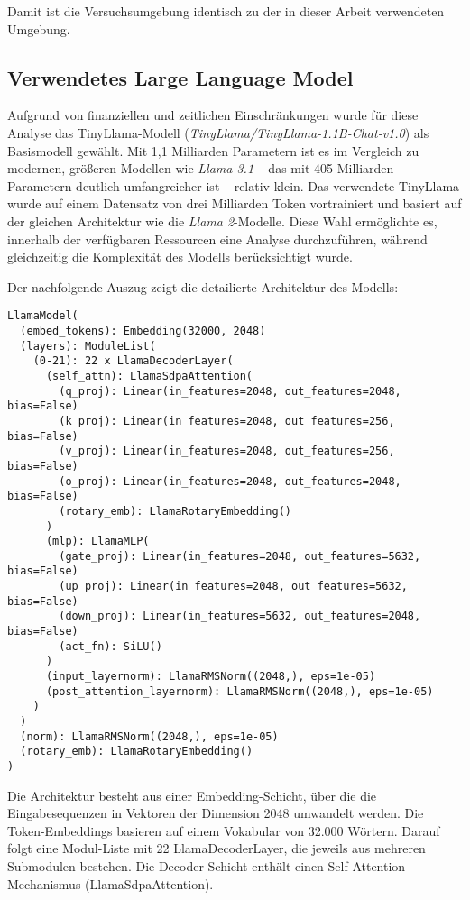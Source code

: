 Damit ist die Versuchsumgebung identisch zu der in dieser Arbeit verwendeten
Umgebung.

\subsection{Verwendetes Large Language Model}

Aufgrund von finanziellen und zeitlichen Einschränkungen wurde für diese Analyse
das TinyLlama-Modell (\emph{TinyLlama/TinyLlama-1.1B-Chat-v1.0}) als Basismodell
gewählt. Mit 1,1 Milliarden Parametern ist es im Vergleich zu modernen, größeren
Modellen wie \emph{Llama 3.1} – das mit 405 Milliarden Parametern deutlich
umfangreicher ist – relativ klein. Das verwendete TinyLlama wurde auf einem
Datensatz von drei Milliarden Token vortrainiert und basiert auf der gleichen
Architektur wie die \emph{Llama 2}-Modelle. Diese Wahl ermöglichte es, innerhalb
der verfügbaren Ressourcen eine Analyse durchzuführen, während gleichzeitig die
Komplexität des Modells berücksichtigt wurde.

Der nachfolgende Auszug zeigt die detailierte Architektur des Modells:

\vspace{1em}
\begin{lstlisting}
LlamaModel(
  (embed_tokens): Embedding(32000, 2048)
  (layers): ModuleList(
    (0-21): 22 x LlamaDecoderLayer(
      (self_attn): LlamaSdpaAttention(
        (q_proj): Linear(in_features=2048, out_features=2048, bias=False)
        (k_proj): Linear(in_features=2048, out_features=256, bias=False)
        (v_proj): Linear(in_features=2048, out_features=256, bias=False)
        (o_proj): Linear(in_features=2048, out_features=2048, bias=False)
        (rotary_emb): LlamaRotaryEmbedding()
      )
      (mlp): LlamaMLP(
        (gate_proj): Linear(in_features=2048, out_features=5632, bias=False)
        (up_proj): Linear(in_features=2048, out_features=5632, bias=False)
        (down_proj): Linear(in_features=5632, out_features=2048, bias=False)
        (act_fn): SiLU()
      )
      (input_layernorm): LlamaRMSNorm((2048,), eps=1e-05)
      (post_attention_layernorm): LlamaRMSNorm((2048,), eps=1e-05)
    )
  )
  (norm): LlamaRMSNorm((2048,), eps=1e-05)
  (rotary_emb): LlamaRotaryEmbedding()
)
\end{lstlisting}

Die Architektur besteht aus einer Embedding-Schicht, über die die
Eingabesequenzen in Vektoren der Dimension 2048 umwandelt werden. Die
Token-Embeddings basieren auf einem Vokabular von 32.000 Wörtern. Darauf folgt
eine Modul-Liste mit 22 LlamaDecoderLayer, die jeweils aus mehreren Submodulen
bestehen. Die Decoder-Schicht enthält einen Self-Attention-Mechanismus
(LlamaSdpaAttention).

